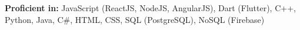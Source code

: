 \textbf{Proficient in:} JavaScript (ReactJS, NodeJS, AngularJS), Dart (Flutter), C++, Python, Java, C#, HTML, CSS, SQL (PostgreSQL), NoSQL (Firebase)

